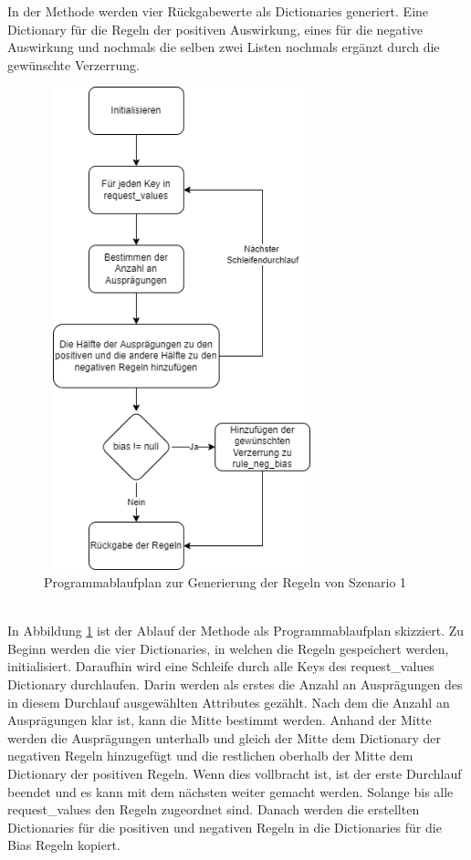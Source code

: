 \begin{onehalfspace}
In der Methode werden vier Rückgabewerte als Dictionaries generiert. Eine Dictionary für die Regeln der positiven Auswirkung, eines für die negative Auswirkung und nochmals die selben zwei Listen nochmals ergänzt durch die gewünschte Verzerrung. 
\begin{figure}[h]
    \centering
    \includegraphics[width=8cm,height=14cm]{Diagramme/Sz1_Regeln.drawio.png}
    \caption{Programmablaufplan zur Generierung der Regeln von Szenario 1}
    \label{fig:Sz1Regeln}
\end{figure}\\
In Abbildung \ref{fig:Sz1Regeln} ist der Ablauf der Methode als Programmablaufplan skizziert. Zu Beginn werden die vier Dictionaries, in welchen die Regeln gespeichert werden, initialisiert. Daraufhin wird eine Schleife durch alle Keys des \glqq{}request\_values\grqq{} Dictionary durchlaufen. Darin werden als erstes die Anzahl an Ausprägungen des in diesem Durchlauf ausgewählten Attributes gezählt. Nach dem die Anzahl an Ausprägungen klar ist, kann die Mitte bestimmt werden. Anhand der Mitte werden die Ausprägungen unterhalb und gleich der Mitte dem Dictionary der negativen Regeln hinzugefügt und die restlichen oberhalb der Mitte dem Dictionary der positiven Regeln. Wenn dies vollbracht ist, ist der erste Durchlauf beendet und es kann mit dem nächsten weiter gemacht werden. Solange bis alle \glqq{}request\_values\grqq{} den Regeln zugeordnet sind. Danach werden die erstellten Dictionaries für die positiven und negativen Regeln in die Dictionaries für die Bias Regeln kopiert.

\end{onehalfspace}
